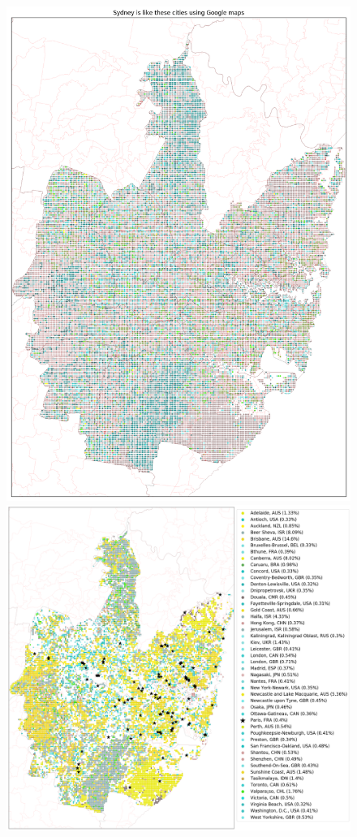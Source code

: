 \documentclass[sageh,times]{sagej}
\begin{document}

\begin{figure}[!htbp]
\centering    
\includegraphics[scale=0.25]{Images/SydneyOverall_maps.png} 
\includegraphics[scale=0.25]{Images/SydneyOverallAbrev_maps.png}  

\end{figure}
\end{document}
